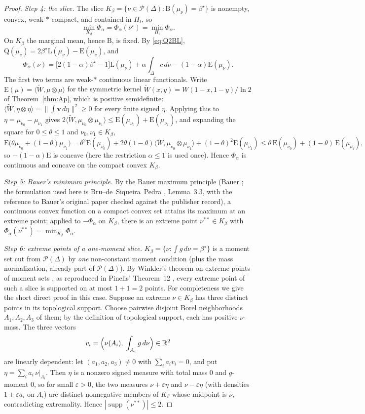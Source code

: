 \documentclass[11pt]{article}
\theoremstyle{plain}
\theoremstyle{definition}
\theoremstyle{remark}
\DeclareMathOperator{\supp}{supp}
\newcommand{\PP}{\mathcal P}
\newcommand{\DD}{\Delta}
\newcommand{\eps}{\varepsilon}
\newcommand{\Lb}{\mathrm{L}}
\newcommand{\Bb}{\mathrm{B}}
\newcommand{\Qq}{\mathrm{Q}}
\newcommand{\Ee}{\mathrm{E}}
\begin{document}
\begin{proof}
\emph{Step 4: the slice.}
The slice
$K_\beta=\{\nu\in\PP(\DD):\Bb(\mu_\nu)=\beta^{\star}\}$
is nonempty, convex, weak-$*$ compact, and contained in $H_t$, so
\[
\min_{K_\beta}\Phi_\alpha
=\Phi_\alpha(\nu^{\star})
=\min_{H_t}\Phi_\alpha.
\]
On $K_\beta$ the marginal mean, hence $\Bb$, is fixed.  By
\eqref{eq:Q2BL},
$\Qq(\mu_\nu)=2\beta^\star\Lb(\mu_\nu)-\Ee(\mu_\nu)$, and
\[
\Phi_\alpha(\nu)
=\bigl[2(1-\alpha)\beta^\star-1\bigr]\Lb(\mu_\nu)
+\alpha\int_{\DD}c\,d\nu-(1-\alpha)\Ee(\mu_\nu).
\]
The first two terms are weak-$*$ continuous linear functionals. Write
$\Ee(\mu)=\langle\widetilde W,\mu\otimes\mu\rangle$ for the symmetric kernel
$\widetilde W(x,y)=W(1-x,1-y)/\ln2$ of Theorem~\ref{thm:Ap}, which is positive
semidefinite: $\langle\widetilde W,\eta\otimes\eta\rangle
=\|\int\mathbf v\,d\eta\|^2\ge0$ for every finite signed $\eta$. Applying this
to $\eta=\mu_{\nu_0}-\mu_{\nu_1}$ gives
$2\langle\widetilde W,\mu_{\nu_0}\otimes\mu_{\nu_1}\rangle
\le\Ee(\mu_{\nu_0})+\Ee(\mu_{\nu_1})$, and expanding the square for
$0\le\theta\le1$ and $\nu_0,\nu_1\in K_\beta$,
\[
\Ee\bigl(\theta\mu_{\nu_0}+(1-\theta)\mu_{\nu_1}\bigr)
=\theta^2\Ee(\mu_{\nu_0})
+2\theta(1-\theta)\langle\widetilde W,\mu_{\nu_0}\otimes\mu_{\nu_1}\rangle
+(1-\theta)^2\Ee(\mu_{\nu_1})
\le\theta\,\Ee(\mu_{\nu_0})+(1-\theta)\,\Ee(\mu_{\nu_1}),
\]
so $-(1-\alpha)\Ee$ is concave (here the restriction $\alpha\le1$ is used
once). Hence $\Phi_\alpha$ is continuous and concave on the compact convex
$K_\beta$.

\emph{Step 5: Bauer's minimum principle.}
By the Bauer maximum principle (Bauer \cite{bauer}; the formulation used here is
Bru--de~Siqueira~Pedra \cite{brupedra}, Lemma~3.3, with the reference to
Bauer's original paper checked against the publisher record), a continuous convex
function on a compact convex set attains its maximum at an extreme point; applied
to $-\Phi_\alpha$ on $K_\beta$, there is an extreme point $\nu^{**}\in K_\beta$
with $\Phi_\alpha(\nu^{**})=\min_{K_\beta}\Phi_\alpha$.

\emph{Step 6: extreme points of a one-moment slice.}
$K_\beta=\{\nu:\int g\,d\nu=\beta^{\star}\}$ is a moment set cut from
$\PP(\DD)$ by \emph{one} non-constant moment condition (plus the mass
normalization, already part of $\PP(\DD)$). By Winkler's theorem on extreme
points of moment sets \cite{winkler}, as reproduced in Pinelis'
Theorem~12 \cite{pinelis}, every extreme point of such a slice is supported on at
most $1+1=2$ points. For completeness we give the short direct proof in this
case. Suppose an extreme \(\nu\in K_\beta\) has three distinct points in its
topological support.  Choose pairwise disjoint Borel neighborhoods
\(A_1,A_2,A_3\) of them; by the definition of topological support, each has
positive \(\nu\)-mass. The three vectors
\[
v_i=\Bigl(\nu(A_i),\;\int_{A_i}g\,d\nu\Bigr)\in\mathbb R^2
\]
are linearly dependent: let $(a_1,a_2,a_3)\ne0$ with $\sum_i a_i v_i=0$,
and put $\eta=\sum_i a_i\,\nu|_{A_i}$. Then $\eta$ is a nonzero signed
measure with total mass $0$ and $g$-moment $0$, so for small $\eps>0$, the
two measures $\nu+\eps\eta$ and $\nu-\eps\eta$ (with densities $1\pm\eps a_i$
on $A_i$) are distinct nonnegative members of $K_\beta$ whose midpoint is $\nu$,
contradicting extremality. Hence $|\supp(\nu^{**})|\le2$.


\end{proof}
\end{document}
